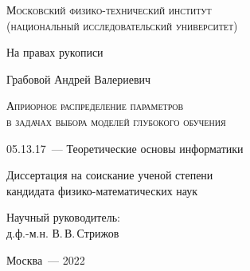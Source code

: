 \thispagestyle{empty}


\begin{titlepage}
\begin{center}
\textsc{Московский физико-технический институт \\ (национальный исследовательский университет)}\\
\end{center}
\vspace{1.5cm}
\begin{flushright}
{На правах рукописи}
\end{flushright}
\vspace{1.5cm}
\begin{center}
{Грабовой Андрей Валериевич}
\par
\vspace{2cm}
\textsc{Априорное распределение параметров \\в задачах выбора моделей глубокого обучения}
\par
\vspace{2cm}
{05.13.17~--- Теоретические основы информатики}
\par
\vspace{2cm}
{Диссертация на соискание ученой степени\\
кандидата физико-математических наук}
\end{center}
\vspace{2cm}
\hfill\parbox{8,4cm}{Научный руководитель:
\\д.ф.-м.н. В.\,В.\,Стрижов}
\par
\vspace{3.5cm}
\begin{center}
{Москва~--- 2022}
\end{center}
\end{titlepage}